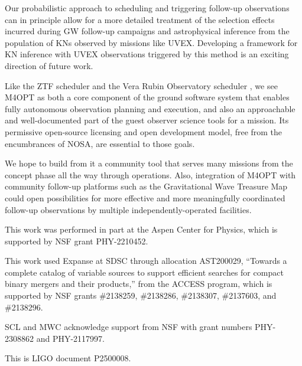 \documentclass[twocolumn,times]{aastex631}
\begin{document}
Our probabilistic approach to scheduling and triggering follow-up observations can in principle allow for a more detailed treatment of the selection effects incurred during \ac{GW} follow-up campaigns and astrophysical inference from the population of \acp{KN} observed by missions like \ac{UVEX}. Developing a framework for \ac{KN} inference with \ac{UVEX} observations triggered by this method is an exciting direction of future work.

Like the \ac{ZTF} scheduler \citep{2019PASP..131f8003B} and the Vera Rubin Observatory scheduler \citep{2019AJ....157..151N}, we see \ac{M4OPT} as both a core component of the ground software system that enables fully autonomous observation planning and execution, and also an approachable and well-documented part of the guest observer science tools for a mission. Its permissive open-source licensing and open development model, free from the encumbrances of \ac{NOSA}, are essential to those goals.

We hope to build from it a community tool that serves many missions from the concept phase all the way through operations. Also, integration of \ac{M4OPT} with community follow-up platforms such as the Gravitational Wave Treasure Map \citep{2020ApJ...894..127W} could open possibilities for more effective and more meaningfully coordinated follow-up observations by multiple independently-operated facilities.

\begin{acknowledgments}
This work was performed in part at the Aspen Center for Physics, which is supported by \ac{NSF} grant PHY-2210452.

This work used Expanse at \ac{SDSC} through allocation AST200029, ``Towards a complete catalog of variable sources to support efficient searches for compact binary mergers and their products,'' from the \ac{ACCESS} program, which is supported by \ac{NSF} grants \#2138259, \#2138286, \#2138307, \#2137603, and \#2138296.

SCL and MWC acknowledge support from \ac{NSF} with grant numbers PHY-2308862 and PHY-2117997.

This is LIGO document P2500008.
\end{acknowledgments}

\vspace{5mm}

{}

\end{document}
